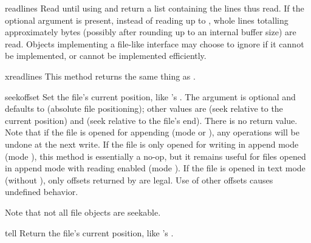 \begin{methoddesc}[file]{readlines}{}
  Read until \EOF{} using  and return a list containing
  the lines thus read.  If the optional  argument is
  present, instead of reading up to \EOF, whole lines totalling
  approximately  bytes (possibly after rounding up to an
  internal buffer size) are read.  Objects implementing a file-like
  interface may choose to ignore  if it cannot be
  implemented, or cannot be implemented efficiently.
\end{methoddesc}

\begin{methoddesc}[file]{xreadlines}{}
  This method returns the same thing as .
\end{methoddesc}

\begin{methoddesc}[file]{seek}{offset}
  Set the file's current position, like 's .
  The  argument is optional and defaults to 
  (absolute file positioning); other values are  (seek
  relative to the current position) and  (seek relative to the
  file's end).  There is no return value.  Note that if the file is
  opened for appending (mode  or ), any
   operations will be undone at the next write.  If the
  file is only opened for writing in append mode (mode ),
  this method is essentially a no-op, but it remains useful for files
  opened in append mode with reading enabled (mode ).  If the
  file is opened in text mode (without ), only offsets returned
  by  are legal.  Use of other offsets causes undefined
  behavior.

  Note that not all file objects are seekable.
\end{methoddesc}

\begin{methoddesc}[file]{tell}{}
  Return the file's current position, like 's
  .

\end{methoddesc}

